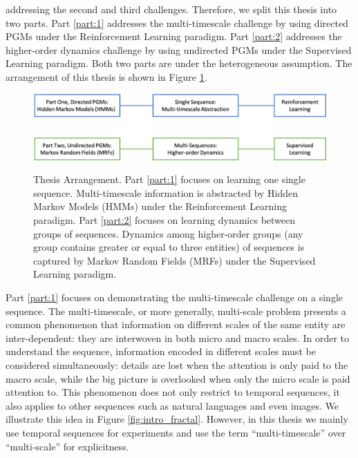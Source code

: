 addressing the second and third challenges. Therefore, we split
this thesis into two parts. Part \ref{part:1} addresses the
multi-timescale challenge by using directed PGMs under the
Reinforcement Learning paradigm. Part \ref{part:2} addresses
the higher-order dynamics challenge by using undirected PGMs
under the Supervised Learning paradigm. Both two parts are under
the heterogeneous assumption. The arrangement of this thesis is
shown in Figure \ref{fig:intro_content}.
\begin{figure}[h]
  \centering
  \includegraphics[width=1\linewidth]{figures/content.png}\\
  \caption{\label{fig:intro_content} Thesis Arrangement. Part
    \ref{part:1} focuses on learning one single sequence.
    Multi-timescale information is abstracted by Hidden Markov
    Models (HMMs) under the Reinforcement Learning paradigm. Part
    \ref{part:2} focuses on learning dynamics between groups of
    sequences. Dynamics among higher-order groups (any group
    contains greater or equal to three entities) of sequences is
    captured by Markov Random Fields (MRFs) under the Supervised
    Learning paradigm.}
\end{figure}

Part \ref{part:1} focuses on demonstrating the multi-timescale
challenge \cite{mandelbrot1997multifractal} on a single sequence.
The multi-timescale, or more generally, multi-scale problem
presents a common phenomenon that information on different scales
of the same entity are inter-dependent: they are interwoven in
both micro and macro scales. In order to understand the sequence,
information encoded in different scales must be considered
simultaneously: details are lost when the attention is only paid
to the macro scale, while the big picture is overlooked when only
the micro scale is paid attention to. This phenomenon does not
only restrict to temporal sequences, it also applies to other
sequences such as natural languages and even images. We
illustrate this idea in Figure \ref{fig:intro_fractal}. However,
in this thesis we mainly use temporal sequences for experiments
and use the term ``multi-timescale'' over ``multi-scale'' for
explicitness.

